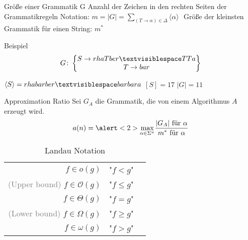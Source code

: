 \begin{frame}{\FrameName}
\begin{block}{Größe einer Grammatik G}
	\Gap
	Anzahl der Zeichen in den rechten Seiten der Grammatikregeln\linebreak
	Notation: $m = \lvert G \lvert = \sum\limits_{(T \rightarrow \alpha) \in \Delta} \langle \alpha \rangle$ \linebreak $ $\linebreak
	Größe der kleinsten Grammatik für einen String: $m^*$
\end{block}
\end{frame}

\begin{frame}{\FrameName}
\begin{block}{Beispiel}
	$$
	G \colon \begin{Bmatrix} 
		S \rightarrow rhaTber \textvisiblespace TTa \\
		T \rightarrow bar
	\end{Bmatrix}
	$$
	
	$\langle S \rangle = rhabarber \textvisiblespace barbara$ \linebreak
	$[S] = 17$ \linebreak
	$\lvert G \lvert = 11$
\end{block}
\end{frame}

\begin{frame}{\FrameName}
\begin{block}{Approximation Ratio}
	\Gap
	Sei $G_A$ die Grammatik, die von einem Algorithmus $A$ erzeugt wird.
	$$
	a(n) = \alert<2>{\max\limits_{\alpha \in \Sigma^n}}\frac{
		\textrm{$\lvert G_A \lvert$ für $\alpha$}
	}{
		\textrm{$m^*$ für $\alpha$}
	}
	$$
	
\end{block}
\end{frame}

\begin{frame}{\FrameName}
\begin{table}
	\caption{Landau Notation}
	\begin{tabular}{ r p{3.5cm} l}
		
		$f \in o(g)$ & "$f < g$" \\
		\textcolor{gray}{(Upper bound)} $f \in \mathcal{O}(g)$ & "$f\leq g$" \\
		$f \in \Theta(g)$ & "$f = g$"\\
		\textcolor{gray}{(Lower bound)} $f \in \Omega(g)$ & "$f \geq g$"\\
		$f \in \omega(g)$ & "$f > g$"\\
	\end{tabular}
\end{table}
\end{frame}